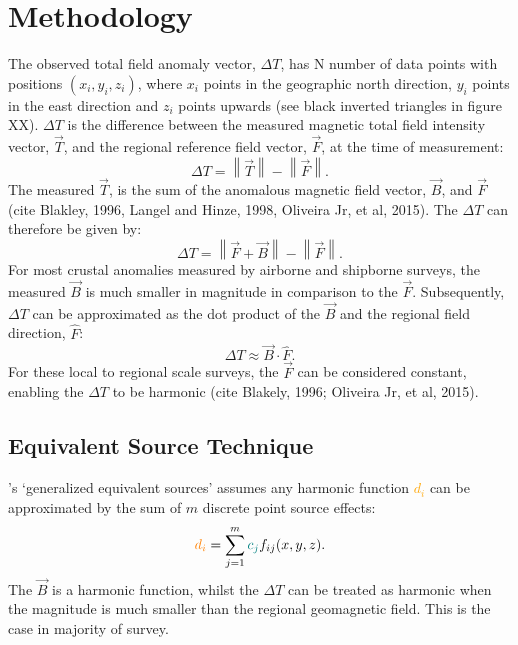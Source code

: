 \section{Methodology}
The observed total field anomaly vector, $\Delta T$, has N number of data points with positions $(x_i, y_i, z_i)$, where $x_i$ points in the geographic north direction, $y_i$ points in the east direction and $z_i$ points upwards (see black inverted triangles in figure XX). $\Delta T$ is the difference between the measured magnetic total field intensity vector, $\vec{T}$, and the regional reference field vector, $\vec{F}$, at the time of measurement:
\begin{equation}
    \Delta T = \left\lVert \vec{T} \right\rVert - \left\lVert \vec{F} \right\rVert.
\end{equation}
The measured $\vec{T}$, is the sum of the anomalous magnetic field vector, $\vec{B}$, and $\vec{F}$ (cite Blakley, 1996, Langel and Hinze, 1998, Oliveira Jr, et al, 2015). The $\Delta T$ can therefore be given by:
\begin{equation}
    \Delta T = \left\lVert \vec{F} + \vec{B} \right\rVert - \left\lVert \vec{F} \right\rVert.
\end{equation}
For most crustal anomalies measured by airborne and shipborne surveys, the measured $\vec{B}$ is much smaller in magnitude in comparison to the $\vec{F}$. Subsequently, $\Delta T$ can be approximated as the dot product of the $\vec{B}$ and the regional field direction, $\hat{F}$:
\begin{equation}
    \Delta T\approx  \vec{B} \cdot \hat{F}.
\end{equation}
For these local to regional scale surveys, the $\vec{F}$ can be considered constant, enabling the $\Delta T$ to be harmonic (cite Blakely, 1996; Oliveira Jr, et al, 2015).

\subsection{Equivalent Source Technique}
\cite{Cordell1992}'s ‘generalized equivalent sources’ assumes any harmonic function \textcolor{orange}{$d_i$} can be approximated by the sum of $m$ discrete point source effects:
\begin{equation}
	\textcolor{orange}{d_i} = \sum_{j=1}^{m} \textcolor{teal}{c_j} f_{ij}(x,y,z).
\end{equation}
The $\vec{B}$ is a harmonic function, whilst the $\Delta T$ can be treated as harmonic when the magnitude is much smaller than the regional geomagnetic field. This is the case in majority of survey.

